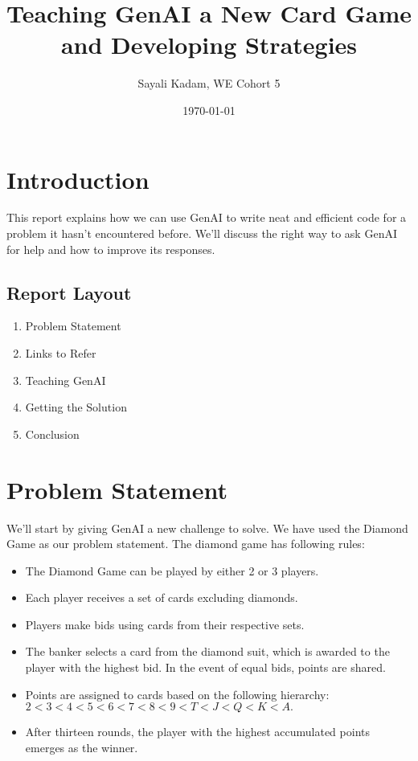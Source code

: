 \documentclass{article}
\title{Teaching GenAI a New Card Game and Developing Strategies}
\author{Sayali Kadam, WE Cohort 5}
\date{\today}
\begin{document}
\maketitle

\section{Introduction}

This report explains how we can use GenAI to write neat and efficient code for a problem it hasn't encountered before. We'll discuss the right way to ask GenAI for help and how to improve its responses.

\subsection{Report Layout}

\begin{enumerate}[label=\arabic*.]
    \item Problem Statement
    \item Links to Refer
    \item Teaching GenAI
    \item Getting the Solution
    \item Conclusion
\end{enumerate}

\section{Problem Statement}

We'll start by giving GenAI a new challenge to solve. We have used the Diamond Game as our problem statement. The diamond game has following rules:
\begin{itemize}[label=-]
    \item The Diamond Game can be played by either 2 or 3 players.
    \item Each player receives a set of cards excluding diamonds.
    \item Players make bids using cards from their respective sets.
    \item The banker selects a card from the diamond suit, which is awarded to the player with the highest bid. In the event of equal bids, points are shared.
    \item Points are assigned to cards based on the following hierarchy: \(2<3<4<5<6<7<8<9<T<J<Q<K<A.\)
    \item After thirteen rounds, the player with the highest accumulated points emerges as the winner.
\end{itemize}
\end{document}
